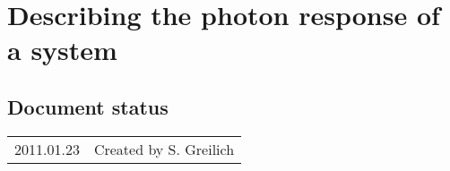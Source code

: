\chapter{Describing the photon response of a system}

\section*{Document status}
\begin{tabular}{l l}
2011.01.23&Created by S. Greilich
\end{tabular} 